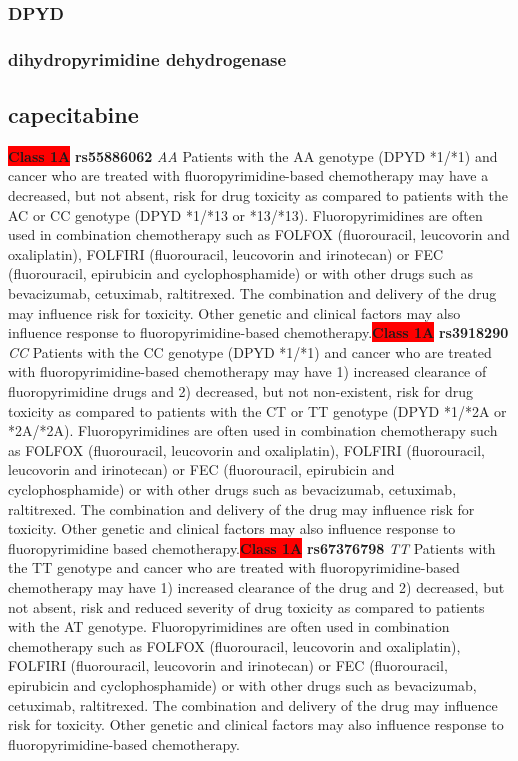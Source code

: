 \documentclass{book}
\begin{document}
\subsubsection{ DPYD }
\subsubsection{ dihydropyrimidine dehydrogenase }

\subsection{ capecitabine }


\begin{center}
\textbf{\colorbox{red} {Class 1A}} \textbf{ rs55886062 } \textit{ AA }
Patients with the AA genotype (DPYD *1/*1) and cancer who are treated with fluoropyrimidine-based chemotherapy may have a decreased, but not absent, risk for drug toxicity as compared to patients with the AC or CC genotype (DPYD *1/*13 or *13/*13). Fluoropyrimidines are often used in combination chemotherapy such as FOLFOX (fluorouracil, leucovorin and oxaliplatin), FOLFIRI (fluorouracil, leucovorin and irinotecan) or FEC (fluorouracil, epirubicin and cyclophosphamide) or with other drugs such as bevacizumab, cetuximab, raltitrexed. The combination and delivery of the drug may influence risk for toxicity. Other genetic and clinical factors may also influence response to fluoropyrimidine-based chemotherapy.\textbf{\colorbox{red} {Class 1A}} \textbf{ rs3918290 } \textit{ CC }
Patients with the CC genotype (DPYD *1/*1) and cancer who are treated with fluoropyrimidine-based chemotherapy may have 1) increased clearance of fluoropyrimidine drugs and 2) decreased, but not non-existent, risk for drug toxicity as compared to patients with the CT or TT genotype (DPYD *1/*2A or *2A/*2A). Fluoropyrimidines are often used in combination chemotherapy such as FOLFOX (fluorouracil, leucovorin and oxaliplatin), FOLFIRI (fluorouracil,  leucovorin and irinotecan) or FEC (fluorouracil, epirubicin and cyclophosphamide) or with other drugs such as bevacizumab, cetuximab, raltitrexed. The combination and delivery of the drug may influence risk for toxicity. Other genetic and clinical factors may also influence response to fluoropyrimidine based chemotherapy.\textbf{\colorbox{red} {Class 1A}} \textbf{ rs67376798 } \textit{ TT }
Patients with the TT genotype and cancer who are treated with fluoropyrimidine-based chemotherapy may have 1) increased clearance of the drug and 2) decreased, but not absent, risk and reduced severity of drug toxicity as compared to patients with the AT genotype. Fluoropyrimidines are often used in combination chemotherapy such as FOLFOX (fluorouracil, leucovorin and oxaliplatin), FOLFIRI (fluorouracil, leucovorin and irinotecan) or FEC (fluorouracil, epirubicin and cyclophosphamide) or with other drugs such as bevacizumab, cetuximab, raltitrexed. The combination and delivery of the drug may influence risk for toxicity. Other genetic and clinical factors may also influence response to fluoropyrimidine-based chemotherapy.





\end{center}
\end{document}
